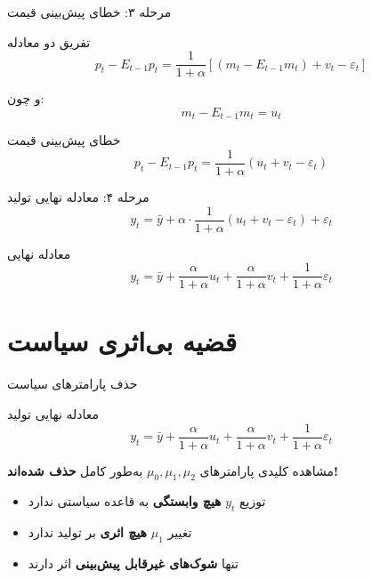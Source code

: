 \documentclass[aspectratio=169,11pt]{beamer}
\newcommand{\highlight}[1]{\textcolor{AccentOrange}{\textbf{#1}}}
\newcommand{\important}[1]{\textcolor{AlertRed}{\textbf{#1}}}
\newcommand{\keyword}[1]{\textcolor{MainBlue}{\textbf{#1}}}
\begin{document}
\begin{frame}{مرحله ۳: خطای پیش‌بینی قیمت}
  \begin{block}{تفریق دو معادله}
    \[
      p_t - E_{t-1}p_t = \frac{1}{1+\alpha}\left[(m_t - E_{t-1}m_t) + v_t - \varepsilon_t\right]
    \]
  \end{block}
  \vspace{0.3cm}
  و چون:
  \[
    m_t - E_{t-1}m_t = u_t
  \]
  \vspace{0.3cm}
  \begin{alertblock}{خطای پیش‌بینی قیمت}
    \centering
    \[
      p_t - E_{t-1}p_t = \frac{1}{1+\alpha}(u_t + v_t - \varepsilon_t)
    \]
  \end{alertblock}
\end{frame}

\begin{frame}{مرحله ۴: معادله نهایی تولید}
  \[
    y_t = \bar{y} + \alpha \cdot \frac{1}{1+\alpha}(u_t + v_t - \varepsilon_t) + \varepsilon_t
  \]
  \vspace{0.5cm}
  \begin{block}{معادله نهایی}
    \centering
    \Large
    \[
      \boxed{y_t = \bar{y} + \frac{\alpha}{1+\alpha}u_t + \frac{\alpha}{1+\alpha}v_t + \frac{1}{1+\alpha}\varepsilon_t}
    \]
  \end{block}
\end{frame}

\section{قضیه بی‌اثری سیاست}

\begin{frame}{حذف پارامترهای سیاست}
  \begin{block}{معادله نهایی تولید}
    \[
      y_t = \bar{y} + \frac{\alpha}{1+\alpha}u_t + \frac{\alpha}{1+\alpha}v_t + \frac{1}{1+\alpha}\varepsilon_t
    \]
  \end{block}
  \vspace{0.3cm}
  \begin{alertblock}{مشاهده کلیدی}
    \centering
    \large
    پارامترهای $\mu_0, \mu_1, \mu_2$ به‌طور کامل \important{حذف شده‌اند!}
  \end{alertblock}
  \vspace{0.3cm}
  \begin{itemize}
    \item توزیع $y_t$ \keyword{هیچ وابستگی} به قاعده سیاستی ندارد
    \item تغییر $\mu_1$ \important{هیچ اثری} بر تولید ندارد
    \item تنها \highlight{شوک‌های غیرقابل پیش‌بینی} اثر دارند
  \end{itemize}
\end{frame}
\end{document}
